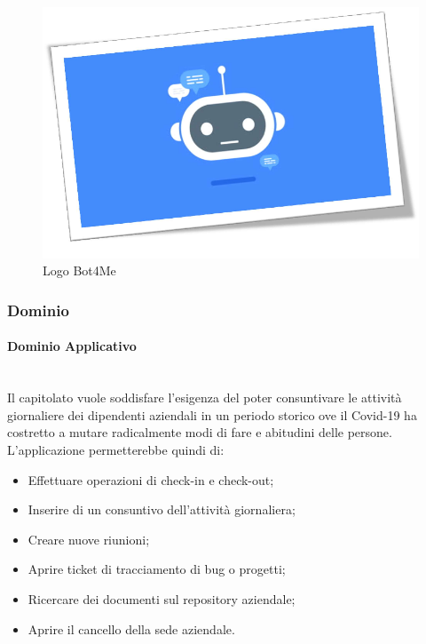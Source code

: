 \documentclass[11pt]{article}
\begin{document}
    \begin{figure}[h!]
        \centering
        \includegraphics[scale=0.3]{Res/BotMe.png}
        \caption{Logo Bot4Me}
        \label{Bot4Me}
    \end{figure} 
    
    \subsubsection{Dominio}
        \paragraph{Dominio Applicativo}~\\

        Il capitolato vuole soddisfare l'esigenza del poter consuntivare le attività giornaliere dei dipendenti aziendali in un
        periodo storico ove il Covid-19 ha costretto a mutare radicalmente modi di fare e abitudini delle persone.
        L'applicazione permetterebbe quindi di:
		\begin{itemize}
			\item Effettuare operazioni di check-in e check-out;
			\item Inserire di un consuntivo dell'attività giornaliera;
			\item Creare nuove riunioni;
			\item Aprire ticket di tracciamento di bug o progetti;
			\item Ricercare dei documenti sul repository aziendale;
			\item Aprire il cancello della sede aziendale.			
		\end{itemize}		        
		
\end{document}
